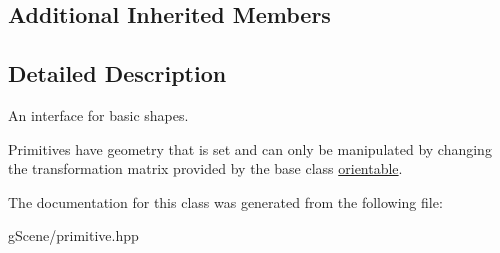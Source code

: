 \subsection*{Additional Inherited Members}


\subsection{Detailed Description}
An interface for basic shapes. 

Primitives have geometry that is set and can only be manipulated by changing the transformation matrix provided by the base class \hyperlink{classgfx_1_1orientable}{orientable}. 

The documentation for this class was generated from the following file\-:\begin{DoxyCompactItemize}
\item 
g\-Scene/primitive.\-hpp\end{DoxyCompactItemize}
